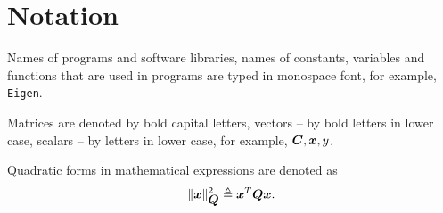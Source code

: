 \section{Notation}
Names of programs and software libraries, names of constants, variables and 
functions that are used in programs are typed in monospace font, for example, \verb|Eigen|.

Matrices are denoted by bold capital letters, vectors -- by bold letters in lower
case, scalars -- by letters in lower case, for example, $\mbox{\boldmath $C$}, \mbox{\boldmath $x$}, y$.

Quadratic forms in mathematical expressions are denoted as
$$
\lVert\mbox{\boldmath $x$}\rVert^2_{\mbox{\boldmath $Q$}} \triangleq \mbox{\boldmath $x$}^T \mbox{\boldmath $Q$} \mbox{\boldmath $x$}.
$$
